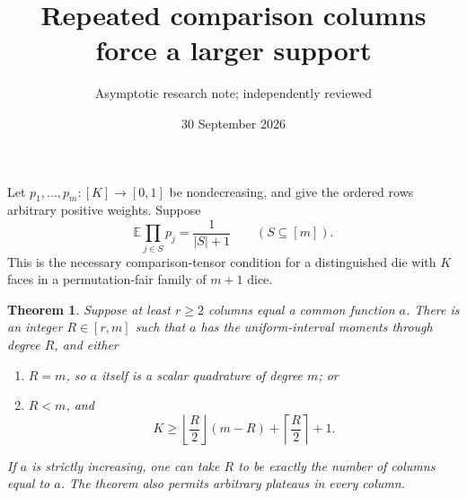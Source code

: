 \documentclass[11pt]{article}
\title{Repeated comparison columns force a larger support}
\author{Asymptotic research note; independently reviewed}
\date{30 September 2026}
\newtheorem{theorem}{Theorem}
\newcommand{\E}{\mathbb E}
\begin{document}
\maketitle
Let $p_1,\ldots,p_m:[K]\to[0,1]$ be nondecreasing, and give the
ordered rows arbitrary positive weights. Suppose
\[
 \E\prod_{j\in S}p_j=\frac1{|S|+1}
 \qquad(S\subseteq[m]).
\]
This is the necessary comparison-tensor condition for a distinguished
die with $K$ faces in a permutation-fair family of $m+1$ dice.

\begin{theorem}\label{main}
Suppose at least $r\ge2$ columns equal a common function $a$.
There is an integer $R\in[r,m]$ such that $a$ has the uniform-interval
moments through degree $R$, and either
\begin{enumerate}
\item $R=m$, so $a$ itself is a scalar quadrature of degree $m$; or
\item $R<m$, and
\[
 K\ge
 \left\lfloor\frac R2\right\rfloor(m-R)
 +\left\lceil\frac R2\right\rceil+1.
\]
\end{enumerate}
If $a$ is strictly increasing, one can take $R$ to be exactly the
number of columns equal to $a$. The theorem also permits arbitrary
plateaus in every column.
\end{theorem}
\end{document}
